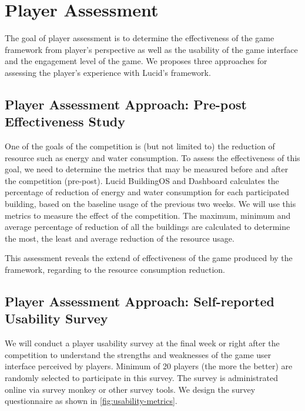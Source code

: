 \documentclass[11pt,oneside]{book}
\begin{document}
\section{Player Assessment}

The goal of player assessment is to determine the effectiveness of the game
framework from player's perspective as well as the usability of the game interface and the engagement level of the game. 
We proposes three approaches for assessing the player's experience with Lucid's framework.

\subsection{Player Assessment Approach: Pre-post Effectiveness Study}
\label{Pre-Post effectiveness study}

One of the goals of the competition is (but not limited to) the reduction of resource such as energy and water consumption. To assess the effectiveness of this goal, we need to determine the metrics that may be measured before and after the competition (pre-post). Lucid BuildingOS and Dashboard calculates the percentage of reduction of energy and water consumption for each participated building, based on the baseline usage of the previous two weeks. We will use this metrics to measure the effect of the competition. The maximum, minimum and average percentage of reduction of all the buildings are calculated to determine the most, the least and average reduction of the resource usage. 

This assessment reveals the extend of effectiveness of the game produced by the framework, regarding to the resource consumption reduction. 
  
\subsection{Player Assessment Approach: Self-reported Usability Survey} 
\label{Self-reported usability survey}

We will conduct a player usability survey at the final week or right after the competition to understand the strengths and weaknesses of the game user interface perceived by players. Minimum of 20 players (the more the better) are randomly selected to participate in this survey. The survey is administrated online via survey monkey or other survey tools. We design the survey questionnaire as shown in \autoref{fig:usability-metrics}.
       
\end{document}
